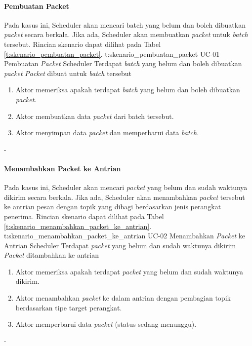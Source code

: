 \paragraph{Pembuatan Packet}
\par Pada kasus ini, Scheduler akan mencari batch yang belum dan boleh dibuatkan \textit{packet} secara berkala. Jika ada, Scheduler akan membuatkan \textit{packet} untuk \textit{batch} tersebut. Rincian skenario dapat dilihat pada Tabel \ref{t:skenario_pembuatan_packet}.
\tableUcDesc
{t:skenario_pembuatan_packet}
{UC-01}
{Pembuatan \textit{Packet}}
{Scheduler}
{Terdapat \textit{batch} yang belum dan boleh dibuatkan \textit{packet}}
{\textit{Packet} dibuat untuk \textit{batch} tersebut}
{
\begin{enumerate}
    \item Aktor memeriksa apakah terdapat \textit{batch} yang belum dan boleh dibuatkan \textit{packet}.
    \item Aktor membuatkan data \textit{packet} dari batch tersebut.
    \item Aktor menyimpan data \textit{packet} dan memperbarui data \textit{batch}.
\end{enumerate}
}
{-}

\paragraph{Menambahkan Packet ke Antrian}
\par Pada kasus ini, Scheduler akan mencari \textit{packet} yang belum dan sudah waktunya dikirim secara berkala. Jika ada, Scheduler akan menambahkan \textit{packet} tersebut ke antrian pesan dengan topik yang dibagi berdasarkan jenis perangkat penerima. Rincian skenario dapat dilihat pada Tabel \ref{t:skenario_menambahkan_packet_ke_antrian}.
\tableUcDesc
{t:skenario_menambahkan_packet_ke_antrian}
{UC-02}
{Menambahkan \textit{Packet} ke Antrian}
{Scheduler}
{Terdapat \textit{packet} yang belum dan sudah waktunya dikirim}
{\textit{Packet} ditambahkan ke antrian}
{
\begin{enumerate}
    \item Aktor memeriksa apakah terdapat \textit{packet} yang belum dan sudah waktunya dikirim.
    \item Aktor menambahkan \textit{packet} ke dalam antrian dengan pembagian topik berdasarkan tipe target perangkat.
    \item Aktor memperbarui data \textit{packet} (status sedang menunggu).
\end{enumerate}
}
{-}

